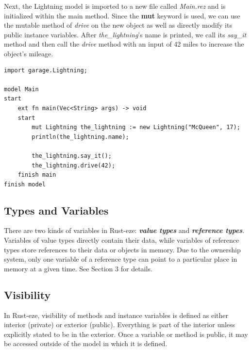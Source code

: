 \documentclass[letterpaper, 10pt, DIV=13]{scrartcl}
\numberwithin{equation}{section}
\numberwithin{figure}{section}
\numberwithin{table}{section}
\begin{document}
Next, the Lightning model is imported to a new file called \textit{Main.rez}
and is initialized within the main method. Since the \textbf{mut} keyword is
used, we can use the mutable method of \textit{drive} on the new object as well
as directly modify its public instance variables. After \textit{the\_lightning}'s
name is printed, we call its \textit{say\_it} method and then call the
\textit{drive} method with an input of 42 miles to increase the object's mileage.

\begin{lstlisting}[caption = Main.rez, frame = single, nolol]
import garage.Lightning;

model Main
start
    ext fn main(Vec<String> args) -> void
    start
        mut Lightning the_lightning := new Lightning("McQueen", 17);
        println(the_lightning.name);

        the_lightning.say_it();
        the_lightning.drive(42);
    finish main
finish model
\end{lstlisting}

\subsection{Types and Variables}
There are two kinds of variables in Rust-eze: \textbf{\textit{value types}} and
\textbf{\textit{reference types}}. Variables of value types directly contain
their data, while variables of reference types store references to their data or
objects in memory. Due to the ownership system, only one variable of a reference
type can point to a particular place in memory at a given time. See Section 3
for details.

\subsection{Visibility}
In Rust-eze, visibility of methods and instance variables is defined as either
interior (private) or exterior (public). Everything is part of the interior unless
explicitly stated to be in the exterior. Once a variable or method is public,
it may be accessed outside of the model in which it is defined.
\end{document}
